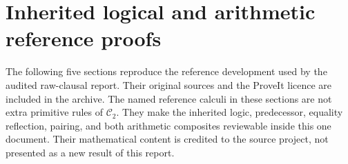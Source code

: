 \documentclass[11pt,letterpaper]{article}
\theoremstyle{definition}
\newcommand{\Cred}{\mathcal C_2}
\begin{document}
\clearpage
\appendix
\section*{Inherited logical and arithmetic reference proofs}
The following five sections reproduce the reference development
used by the audited raw-clausal report. Their original sources
and the ProveIt licence are included in the archive. The named
reference calculi in these sections are not extra primitive rules
of $\Cred$. They make the inherited logic, predecessor, equality
reflection, pairing, and both arithmetic composites reviewable
inside this one document. Their mathematical content is credited
to the source project, not presented as a new result of this report.
\end{document}
